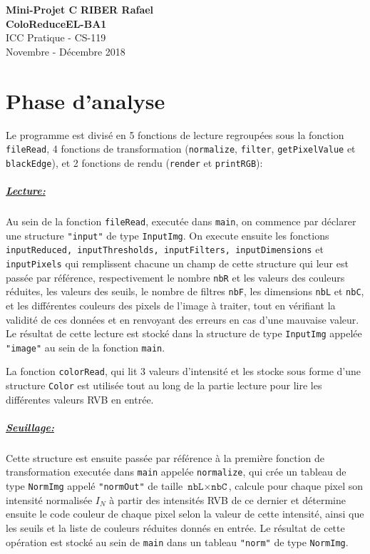 \documentclass[a4paper, 11pt]{article}
\begin{document}
\noindent
\large\textbf{Mini-Projet C\raisebox{.5\height}{\scalebox{.5}{++}}} \hfill \textbf{RIBER Rafael} \\
\large\textbf{ColoReduce}\hfill \textbf{EL-BA1}\\
\normalsize ICC Pratique - CS-119\\
\hfill Novembre - Décembre 2018

\section*{Phase d'analyse}
Le programme est divisé en 5 fonctions de lecture regroupées sous la fonction \texttt{fileRead}, 4 fonctions de transformation (\texttt{normalize}, \texttt{filter}, \texttt{getPixelValue} et \texttt{blackEdge}), et 2 fonctions de rendu (\texttt{render} et \texttt{printRGB}):
\subparagraph{\underline{\textit{Lecture:}}}
Au sein de la fonction \texttt{fileRead}, executée dans \texttt{main}, on commence par déclarer une structure \texttt{"input"} de type \texttt{InputImg}. On execute ensuite les fonctions \texttt{inputReduced, inputThresholds, inputFilters, inputDimensions} et \texttt{inputPixels} qui remplissent chacune un champ de cette structure qui leur est passée par référence, respectivement le nombre \texttt{nbR} et les valeurs des couleurs réduites, les valeurs des seuils, le nombre de filtres \texttt{nbF}, les dimensions \texttt{nbL} et \texttt{nbC}, et les différentes couleurs des pixels de l'image à traiter, tout en vérifiant la validité de ces données et en renvoyant des erreurs en cas d'une mauvaise valeur. Le résultat de cette lecture est stocké dans la structure de type \texttt{InputImg} appelée \texttt{"image"} au sein de la fonction \texttt{main}. 

La fonction \texttt{colorRead}, qui lit 3 valeurs d'intensité et les stocke sous forme d'une structure \texttt{Color} est utilisée tout au long de la partie lecture pour lire les différentes valeurs RVB en entrée.

\subparagraph{\underline{\textit{Seuillage:}}}
Cette structure est ensuite passée par référence à la première fonction de transformation executée dans \texttt{main} appelée \texttt{normalize}, qui crée un tableau de type \texttt{NormImg} appelé \texttt{"normOut"} de taille $\texttt{nbL} \times \texttt{nbC}$, calcule pour chaque pixel son intensité normalisée $I_N$ à partir des intensités RVB de ce dernier et détermine ensuite le code couleur de chaque pixel selon la valeur de cette intensité, ainsi que les seuils et la liste de couleurs réduites donnés en entrée. Le résultat de cette opération est stocké au sein de \texttt{main} dans un tableau \texttt{"norm"} de type \texttt{NormImg}.
\end{document}
